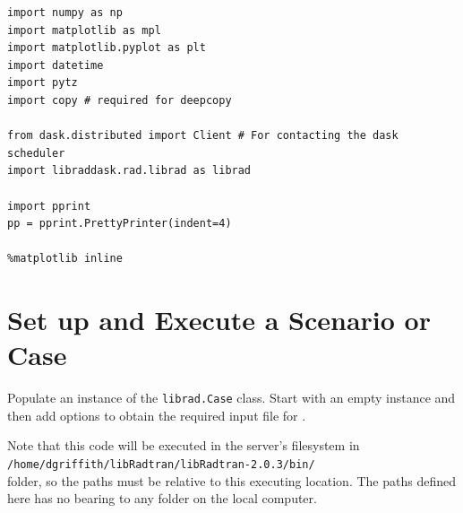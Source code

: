 \begin{lstlisting}[style=tinysize]
import numpy as np
import matplotlib as mpl
import matplotlib.pyplot as plt
import datetime
import pytz
import copy # required for deepcopy

from dask.distributed import Client # For contacting the dask scheduler
import libraddask.rad.librad as librad

import pprint
pp = pprint.PrettyPrinter(indent=4)

%matplotlib inline
\end{lstlisting}


\section{Set up and Execute a Scenario or Case}
\label{sec:SetupandExecuteaScenarioorCase}

Populate an instance of the \lstinline{librad.Case} class.
Start with an empty instance and then add options to obtain the required input file for \libradtran{}.

Note that this code will be executed in the server's filesystem in\\
\lstinline{/home/dgriffith/libRadtran/libRadtran-2.0.3/bin/}\\
folder, so the paths must be relative to this executing location.  The paths defined here has no bearing to any folder on the local computer.




